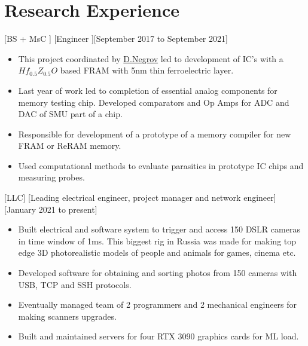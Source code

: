 \documentclass{article}
\begin{document}
\section{Research Experience}
 
[BS + MsC ]
[Engineer ][September 2017 to September 2021]
 
\begin{itemize}
\item This project coordinated by  \href{https://www.scopus.com/authid/detail.uri?authorId=56272708000}{D.Negrov}   led to development of IC's with a $Hf_{0.5} Z_{0.5} O $ based  FRAM with 5nm thin ferroelectric layer.
\item Last year of work led to completion of essential analog components for memory testing chip. Developed comparators and Op Amps for ADC and DAC of SMU part of a chip.
\item Responsible for development of a prototype of a memory  compiler for new FRAM or ReRAM memory.
\item Used computational methods to evaluate parasitics in prototype IC chips and measuring probes.

\end{itemize}
 
[LLC]
[Leading electrical engineer, project manager and network engineer][January 2021 to present]
 
\begin{itemize}
   \item Built electrical and software system to trigger and access 150 DSLR cameras in time window of 1ms. This biggest rig in Russia was made for making top edge 3D photorealistic models of people and animals for games, cinema etc.
   \item Developed software for obtaining and sorting photos from 150 cameras with USB, TCP and SSH protocols.
   \item Eventually managed team of 2 programmers and 2 mechanical engineers for making scanners upgrades.
   \item Built and maintained servers for four RTX 3090 graphics cards for ML load.
   \end{itemize}
 
\end{document}
